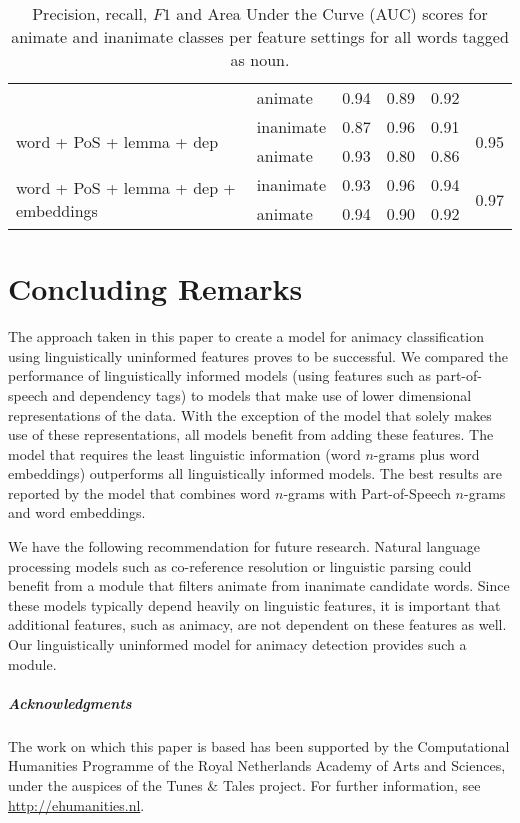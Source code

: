 \documentclass[a4paper,UKenglish]{oasics}
\begin{document}
\begin{table}
\begin{tabular}{llrrrr}
                                                       & animate       &       0.94 &    0.89 &    0.92 &  \\
\multirow{2}{*}{word + PoS + lemma + dep}              & inanimate     &       0.87 &    0.96 &    0.91 & \multirow{2}{*}{0.95} \\
                                                       & animate       &       0.93 &    0.80 &    0.86 &  \\
\multirow{2}{*}{word + PoS + lemma + dep + embeddings} & inanimate     &       0.93 &    0.96 &    0.94 & \multirow{2}{*}{0.97} \\
                                                       & animate       &       0.94 &    0.90 &    0.92 &  \\
\bottomrule
\end{tabular}
\caption{Precision, recall, $F1$ and Area Under the Curve (AUC) scores for animate and inanimate classes
  per feature settings for all words tagged as noun.}
\label{tab:results-noun}
\end{table}


\section{Concluding Remarks}

The approach taken in this paper to create a model for animacy
classification using linguistically uninformed features proves to be
successful. We compared the performance of linguistically informed
models (using features such as part-of-speech and dependency tags) to
models that make use of lower dimensional representations of the
data. With the exception of the model that solely makes use of these
representations, all models benefit from adding these features. The
model that requires the least linguistic information (word $n$-grams
plus word embeddings) outperforms all linguistically informed
models. The best results are reported by the model that combines word
$n$-grams with Part-of-Speech $n$-grams and word embeddings.

We have the following recommendation for future research. Natural
language processing models such as co-reference resolution or
linguistic parsing could benefit from a module that filters animate
from inanimate candidate words. Since these models typically depend
heavily on linguistic features, it is important that additional
features, such as animacy, are not dependent on these features as
well. Our linguistically uninformed model for animacy detection
provides such a module.



\subparagraph*{Acknowledgments}

The work on which this paper is based has been supported by the
Computational Humanities Programme of the Royal Netherlands Academy of
Arts and Sciences, under the auspices of the Tunes \& Tales
project. For further information, see \url{http://ehumanities.nl}.


\end{document}
